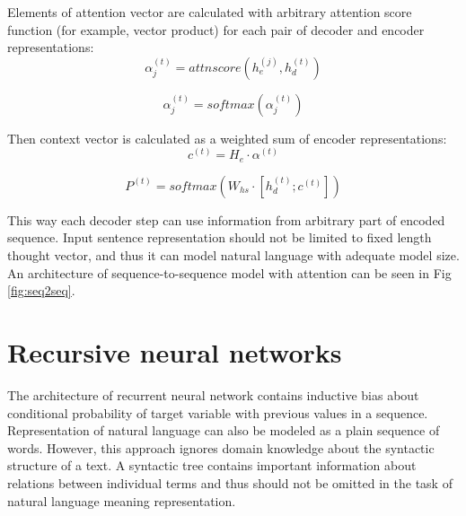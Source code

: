 Elements of attention vector are calculated with arbitrary attention score function (for example, vector product) for each pair of decoder and encoder representations:
\begin{equation}
\alpha_j^{(t)} = attnscore(h_e^{(j)}, h_d^{(t)})
\label{attn:alpha}
\end{equation}

\begin{equation}
\alpha_j^{(t)} = softmax(\alpha_j^{(t)})
\label{attn:alpha2}
\end{equation}

Then context vector is calculated as a weighted sum of encoder representations:
\begin{equation}
	c^{(t)} = H_e\cdot\alpha^{(t)}
	\label{attn:c}
\end{equation}

\begin{equation}
	P^{(t)} = softmax(W_{hs}\cdot[h_d^{(t)};c^{(t)}])
\label{attn:P}
\end{equation}

This way each decoder step can use information from arbitrary part of encoded sequence. Input sentence representation should not be limited to fixed length thought vector, and thus it can model natural language with adequate model size. An architecture of sequence-to-sequence model with attention can be seen in Fig \ref{fig:seq2seq}.

\section{Recursive neural networks} \label{sec:rvnn}

The architecture of recurrent neural network contains inductive bias about conditional probability of target variable with previous values in a sequence. Representation of natural language can also be modeled as a plain sequence of words. However, this approach ignores domain knowledge about the syntactic structure of a text. A syntactic tree contains important information about relations between individual terms and thus should not be omitted in the task of natural language meaning representation.

